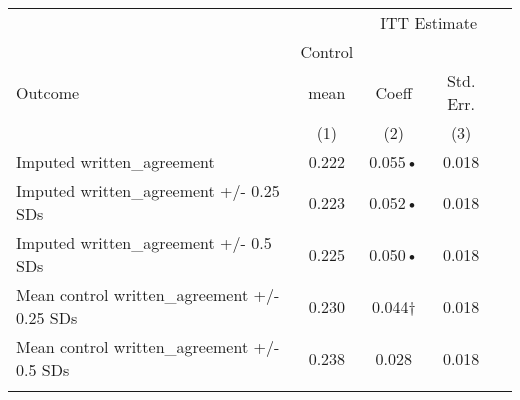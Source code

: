 \begin{tabular}{lcccc}
\hline \noalign{\smallskip} &  & \multicolumn{2}{c}{{ ITT Estimate}} & \\
\cline{3-4} & Control &  &  & \\
Outcome & mean & Coeff & Std. Err. & \\
 & (1) & (2) & (3) & \\
\noalign{\smallskip}\hline \noalign{\smallskip}Imputed written\_agreement & 0.222 & 0.055• & 0.018 & \\
Imputed written\_agreement +/- 0.25 SDs & 0.223 & 0.052• & 0.018 & \\
Imputed written\_agreement +/- 0.5 SDs & 0.225 & 0.050• & 0.018 & \\
Mean control written\_agreement +/- 0.25 SDs & 0.230 & 0.044† & 0.018 & \\
Mean control written\_agreement +/- 0.5 SDs & 0.238 & 0.028 & 0.018 & \\
\noalign{\smallskip}\hline\end{tabular}\\

